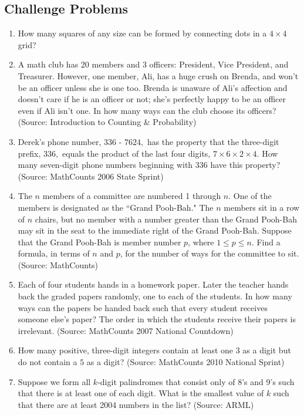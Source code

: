 \documentclass[12pt, letterpaper]{article}
\begin{document}
\subsection{Challenge Problems}

\begin{enumerate}
    \item How many squares of any size can be formed by connecting dots in a $4 \times 4$ grid?
    \item A math club has 20 members and 3 officers: President, Vice President, and Treasurer. However, one member, Ali, has a huge crush on Brenda, and won't be an officer unless she is one too. Brenda is unaware of Ali's affection and doesn't care if he is an officer or not; she's perfectly happy to be an officer even if Ali isn't one. In how many ways can the club choose its officers? (Source: Introduction to Counting \& Probability)
    \item Derek's phone number, $336$ - $7624,$ has the property that the three-digit prefix, $336,$ equals the product of the last four digits, $7 \times 6 \times 2 \times 4.$ How many seven-digit phone numbers beginning with $336$ have this property? (Source: MathCounts 2006 State Sprint)
    \item The $n$ members of a committee are numbered 1 through $n$. One of the members is designated as the ``Grand Pooh-Bah." The $n$ members sit in a row of $n$ chairs, but no member with a number greater than the Grand Pooh-Bah may sit in the seat to the immediate right of the Grand Pooh-Bah. Suppose that the Grand Pooh-Bah is member number $p$, where $1 \le p \le n$. Find a formula, in terms of $n$ and $p$, for the number of ways for the committee to sit. (Source: MathCounts)
    \item Each of four students hands in a homework paper. Later the teacher hands back the graded papers randomly, one to each of the students. In how many ways can the papers be handed back such that every student receives someone else's paper? The order in which the students receive their papers is irrelevant. (Source: MathCounts 2007 National Countdown)
    \item How many positive, three-digit integers contain at least one $3$ as a digit but do not contain a $5$ as a digit? (Source: MathCounts 2010 National Sprint)
    \item Suppose we form all $k$-digit palindromes that consist only of 8's and 9's such that there is at least one of each digit. What is the smallest value of $k$ such that there are at least 2004 numbers in the list? (Source: ARML)
\end{enumerate}
\end{document}
